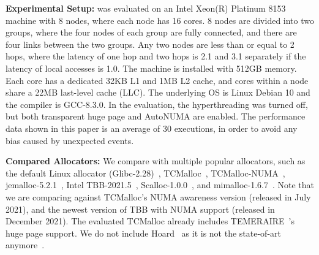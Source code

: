 \textbf{Experimental Setup:}  \NM{} was evaluated on an Intel Xeon(R) Platinum 8153 machine with 8 nodes, where each node has 16 cores. 8 nodes are divided into two groups, where the four nodes of each group are fully connected, and there are four links between the two groups. Any two nodes are less than or equal to 2 hops, where the latency of one hop and two hops is 2.1 and 3.1 separately if the latency of local accesses is 1.0. The machine is installed with 512GB memory. Each core has a dedicated 32KB L1 and 1MB L2 cache, and cores within a node share a 22MB last-level cache (LLC). The underlying OS is Linux Debian 10 and the compiler is GCC-8.3.0. In the evaluation, the hyperthreading was turned off, but both transparent huge page and AutoNUMA are enabled. The performance data shown in this paper is an average of 30 executions, in order to avoid any bias caused by unexpected events.

\textbf{Compared Allocators: } We compare \NM{} with multiple popular allocators, such as the default Linux allocator (Glibc-2.28)~\cite{glibcweb}, TCMalloc~\cite{tcmalloc2},  TCMalloc-NUMA~\cite{tcmallocnuma}, jemalloc-5.2.1~\cite{jemalloc}, Intel TBB-2021.5~\cite{tbb2}, Scalloc-1.0.0~\cite{Scalloc}, and mimalloc-1.6.7~\cite{mimalloc}. Note that we are comparing against TCMalloc's NUMA awareness version (released in July 2021), and the newest version of TBB with NUMA support (released in December 2021). The evaluated TCMalloc already includes TEMERAIRE~\cite{TEMERAIRE}'s huge page support. 
We do not include Hoard~\cite{Hoard} as it is not the state-of-art anymore~\cite{Scalloc, mimalloc}. 

